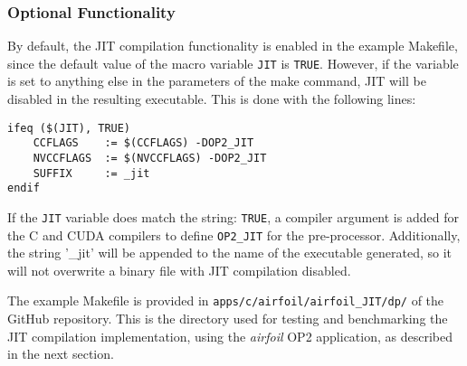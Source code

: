 \subsubsection{Optional Functionality}
By default, the JIT compilation functionality is enabled in the example Makefile, since the default value of the macro variable \verb|JIT| is \verb|TRUE|. However, if the variable is set to anything else in the parameters of the make command, JIT will be disabled in the resulting executable. This is done with the following lines:
\begin{lstlisting}[linewidth = \textwidth, framesep=0pt]
ifeq ($(JIT), TRUE)
	CCFLAGS    := $(CCFLAGS) -DOP2_JIT
	NVCCFLAGS  := $(NVCCFLAGS) -DOP2_JIT
	SUFFIX     := _jit
endif
\end{lstlisting}
If the \verb|JIT| variable does match the string: \verb|TRUE|, a compiler argument is added for the C and CUDA compilers to define \verb|OP2_JIT| for the pre-processor. Additionally, the string '\_jit' will be appended to the name of the executable generated, so it will not overwrite a binary file with JIT compilation disabled.
\par
The example Makefile is provided in \verb|apps/c/airfoil/airfoil_JIT/dp/| of the GitHub repository. This is the directory used for testing and benchmarking the JIT compilation implementation, using the \textit{airfoil} OP2 application, as described in the next section.

